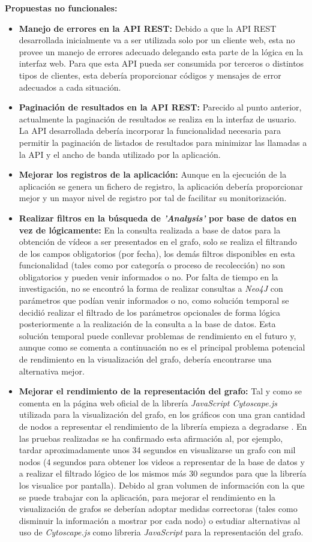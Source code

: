 \documentclass[11pt,a4paper]{article}
\begin{document}
\noindent\textbf{Propuestas no funcionales:}
\begin{itemize}
\item \textbf{Manejo de errores en la API REST:} Debido a que la API REST desarrollada inicialmente va a ser utilizada solo por un cliente web, esta no provee un manejo de errores adecuado delegando esta parte de la lógica en la interfaz web. Para que esta API pueda ser consumida por terceros o distintos tipos de clientes, esta debería proporcionar códigos y mensajes de error adecuados a cada situación.
\item \textbf{Paginación de resultados en la API REST:} Parecido al punto anterior, actualmente la paginación de resultados se realiza en la interfaz de usuario. La API desarrollada debería incorporar la funcionalidad necesaria para permitir la paginación de listados de resultados para minimizar las llamadas a la API y el ancho de banda utilizado por la aplicación.
\item \textbf{Mejorar los registros de la aplicación:} Aunque en la ejecución de la aplicación se genera un fichero de registro, la aplicación debería proporcionar mejor y un mayor nivel de registro por tal de facilitar su monitorización.
\item \textbf{Realizar filtros en la búsqueda de \textit{'Analysis'} por base de datos en vez de lógicamente:} En la consulta realizada a base de datos para la obtención de vídeos a ser presentados en el grafo, solo se realiza el filtrando de los campos obligatorios (por fecha), los demás filtros disponibles en esta funcionalidad (tales como por categoría o proceso de recolección) no son obligatorios y pueden venir informados o no. Por falta de tiempo en la investigación, no se encontró la forma de realizar consultas a \textit{Neo4J} con parámetros que podían venir informados o no, como solución temporal se decidió realizar el filtrado de los parámetros opcionales de forma lógica posteriormente a la realización de la consulta a la base de datos. Esta solución temporal puede conllevar problemas de rendimiento en el futuro y, aunque como se comenta a continuación no es el principal problema potencial de rendimiento en la visualización del grafo,  debería encontrarse una alternativa mejor. 
\item \textbf{Mejorar el rendimiento de la representación del grafo:} Tal y como se comenta en la página web oficial de la librería \textit{JavaScript Cytoscape.js} utilizada para la visualización del grafo, en los gráficos con una gran cantidad de nodos a representar el rendimiento de la librería empieza a degradarse  \cite{28}. En las pruebas realizadas se ha confirmado esta afirmación al, por ejemplo, tardar aproximadamente unos 34 segundos en visualizarse un grafo con mil nodos (4 segundos para obtener los videos a representar de la base de datos y a realizar el filtrado lógico de los mismos más 30 segundos para que la librería los visualice por pantalla). Debido al gran volumen de información con la que se puede trabajar con la aplicación, para mejorar el rendimiento en la visualización de grafos se deberían adoptar medidas correctoras (tales como disminuir la información a mostrar por cada nodo) o estudiar alternativas al uso de \textit{Cytoscape.js} como libreria \textit{JavaScript} para la representación del grafo.

\end{itemize}
\end{document}
